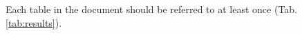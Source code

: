 \documentclass[a4paper,twoside,12pt]{book}
\begin{document}
%
%
%
%
%


Each table in the document should be referred to at least once (Tab. \ref{tab:results}).
\end{document}
